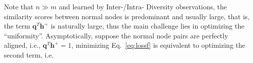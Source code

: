 Note that $n\gg m$ and learned by Inter-/Intra- Diversity observations, the similarity scores between normal nodes is predominant and usually large, that is, the term $\boldsymbol{q}^T\boldsymbol{h}^+$ is naturally large, thus the main challenge lies in optimizing the ``uniformity''. Asymptotically, suppose the normal node pairs are perfectly aligned, i.e., $\boldsymbol{q}^T\boldsymbol{h}^+=1$, minimizing Eq.~\eqref{eq:lossf} is equivalent to optimizing the second term, i.e.


